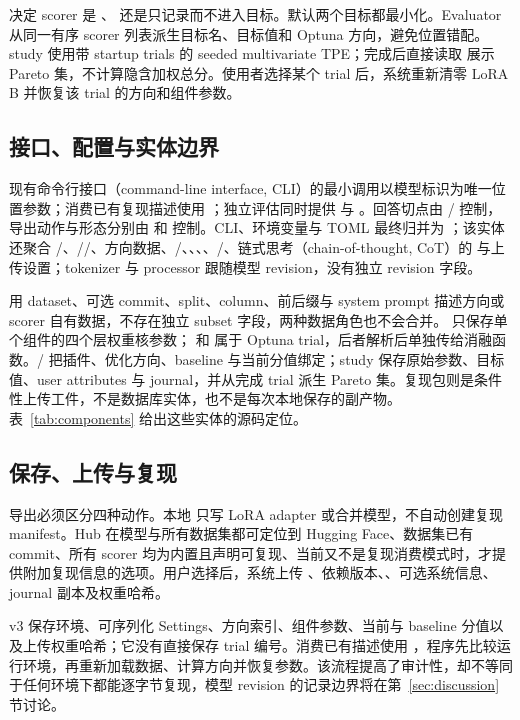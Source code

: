  决定 scorer 是 、 还是只记录而不进入目标。默认两个目标都最小化。Evaluator 从同一有序 scorer 列表派生目标名、目标值和 Optuna 方向，避免位置错配。study 使用带 startup trials 的 seeded multivariate TPE；完成后直接读取  展示 Pareto 集，不计算隐含加权总分。使用者选择某个 trial 后，系统重新清零 LoRA B 并恢复该 trial 的方向和组件参数。

\subsection{接口、配置与实体边界}

现有命令行接口（command-line interface, CLI）的最小调用以模型标识为唯一位置参数；消费已有复现描述使用 ；独立评估同时提供  与 。回答切点由 / 控制，导出动作与形态分别由  和  控制。CLI、环境变量与 TOML 最终归并为 ；该实体还聚合 /、//、方向数据、/、、、、/、链式思考（chain-of-thought, CoT）的  与上传设置；tokenizer 与 processor 跟随模型 revision，没有独立 revision 字段。

 用 dataset、可选 commit、split、column、前后缀与 system prompt 描述方向或 scorer 自有数据，不存在独立 subset 字段，两种数据角色也不会合并。 只保存单个组件的四个层权重核参数； 和  属于 Optuna trial，后者解析后单独传给消融函数。/ 把插件、优化方向、baseline 与当前分值绑定；study 保存原始参数、目标值、user attributes 与 journal，并从完成 trial 派生 Pareto 集。复现包则是条件性上传工件，不是数据库实体，也不是每次本地保存的副产物。表~\ref{tab:components} 给出这些实体的源码定位。

\subsection{保存、上传与复现}

导出必须区分四种动作。本地  只写 LoRA adapter 或合并模型，不自动创建复现 manifest。Hub  在模型与所有数据集都可定位到 Hugging Face、数据集已有 commit、所有 scorer 均为内置且声明可复现、当前又不是复现消费模式时，才提供附加复现信息的选项。用户选择后，系统上传 、依赖版本、、可选系统信息、journal 副本及权重哈希。

 v3 保存环境、可序列化 Settings、方向索引、组件参数、当前与 baseline 分值以及上传权重哈希；它没有直接保存 trial 编号。消费已有描述使用 ，程序先比较运行环境，再重新加载数据、计算方向并恢复参数。该流程提高了审计性，却不等同于任何环境下都能逐字节复现，模型 revision 的记录边界将在第~\ref{sec:discussion} 节讨论。
